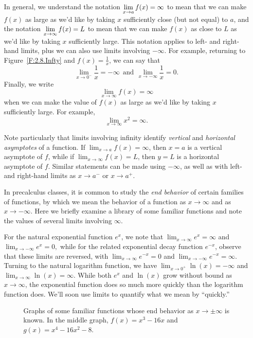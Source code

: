 In general, we understand the notation $\displaystyle \lim_{x \to a} f(x) = \infty$ to mean that we can make $f(x)$ as large as we'd like by taking $x$ sufficiently close (but not equal) to $a$, and the notation $\displaystyle \lim_{x \to \infty} f(x) = L$ to mean that we can make $f(x)$ as close to $L$ as we'd like by taking $x$ sufficiently large.  This notation applies to left- and right-hand limits, plus we can also use limits involving $-\infty$.  For example, returning to Figure~\ref{F:2.8.Infty} and $f(x) = \frac{1}{x}$, we can say that
$$\lim_{x \to 0^-} \frac{1}{x} = -\infty \ \ \mbox{and} \ \ \lim_{x \to -\infty} \frac{1}{x} = 0.$$
Finally, we write
$$\lim_{x \to \infty} f(x) = \infty$$
when we can make the value of $f(x)$ as large as we'd like by taking $x$ sufficiently large.  For example, $$\lim_{x \to \infty} x^2 = \infty.$$

Note particularly that limits involving infinity identify \emph{vertical} and \emph{horizontal asymptotes}    of a function.  If $\lim_{x \to a} f(x) = \infty$, then $x = a$ is a vertical asymptote of $f$, while if $\lim_{x \to \infty} f(x) = L$, then $y = L$ is a horizontal asymptote of $f$.  Similar statements can be made using $-\infty$, as well as with left- and right-hand limits as $x \to a^-$ or $x \to a^+$.

In precalculus classes, it is common to study the \emph{end behavior} of certain families of functions, by which we mean the behavior of a function as $x \to \infty$ and as $x \to -\infty$.  Here we briefly examine a library of some familiar functions and note the values of several limits involving $\infty$.

For the natural exponential function $e^x$, we note that $\lim_{x \to \infty} e^x = \infty$ and $\lim_{x \to -\infty} e^x = 0,$ while for the related exponential decay function $e^{-x}$, observe that these limits are reversed, with $\lim_{x \to \infty} e^{-x} = 0$ and $\lim_{x \to -\infty} e^{-x} = \infty.$  Turning to the natural logarithm function, we have $\lim_{x \to 0^+} \ln(x) = -\infty$ and $\lim_{x \to \infty} \ln(x) = \infty.$  While both $e^x$ and $\ln(x)$ grow without bound as $x \to \infty$, the exponential function does so much more quickly than the logarithm function does.  We'll soon use limits to quantify what we mean by ``quickly.''

\begin{figure}[h]
\begin{center}
\caption{Graphs of some familiar functions whose end behavior as $x \to \pm \infty$ is known.  In the middle graph, $f(x) = x^3 - 16x$ and $g(x) = x^4 - 16x^2 - 8$.} \label{F:2.8.InftyLib}
\end{center}
\end{figure}

